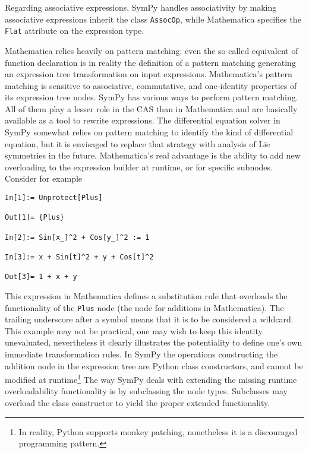Regarding associative expressions,
SymPy handles associativity by making associative expressions inherit the
class \texttt{AssocOp},
while Mathematica specifies the \texttt{Flat}\cite{WolframRefFlat} attribute on the expression type.




Mathematica relies heavily on pattern matching:
even the so-called equivalent of function declaration is in reality
the definition of a pattern matching generating an expression tree transformation
on input expressions.
%
Mathematica's pattern matching is sensitive to associative\cite{WolframRefFlat}, commutative\cite{WolframRefOrderless},
and one-identity\cite{WolframRefOneIdentity} properties of its expression tree nodes\cite{WolframRefFlatAndOrderlessFunctions}.
%
SymPy has various ways to perform pattern matching.
All of them play a lesser role in the CAS than in Mathematica
and are basically available as a tool to rewrite expressions.
The differential equation solver in SymPy somewhat relies on pattern matching to
identify the kind of differential equation, but it is envisaged to replace
that strategy with analysis of Lie symmetries in the future.
Mathematica's real advantage is the ability to add new overloading to the
expression builder at runtime, or for specific subnodes.
Consider for example
\begin{verbatim}
In[1]:= Unprotect[Plus]

Out[1]= {Plus}

In[2]:= Sin[x_]^2 + Cos[y_]^2 := 1

In[3]:= x + Sin[t]^2 + y + Cos[t]^2

Out[3]= 1 + x + y
\end{verbatim}
This expression in Mathematica defines a substitution rule that overloads
the functionality of the \texttt{Plus} node (the node for additions in Mathematica).
The trailing underscore after a symbol means that it is to be considered a
wildcard.
This example may not be practical, one may wish to keep this identity
unevaluated, nevertheless it clearly illustrates the potentiality to define
one's own immediate transformation rules.
In SymPy the operations constructing the addition node in the expression tree
are Python class constructors,
and cannot be modified at runtime\footnote{In reality, Python supports monkey patching,
nonetheless it is a discouraged programming pattern.}
The way SymPy deals with extending the missing runtime overloadability functionality
is by subclassing the node types.
Subclasses may overload the class constructor to yield the proper
extended functionality.


